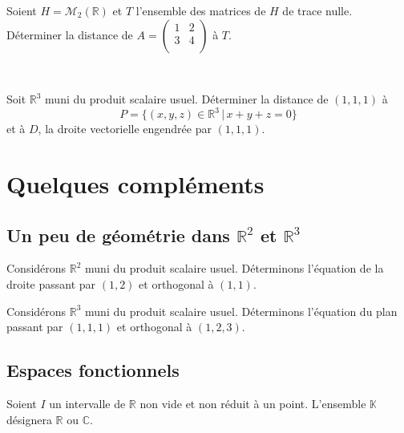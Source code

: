 \documentclass[a4paper,10pt]{report}
\begin{document}
\begin{preuve}
\vspace{8.5cm}
\end{preuve}

\begin{ex} Soient $H = \mathcal{M}_2(\mathbb{R})$ et $T$ l'ensemble des matrices de $H$ de trace nulle. Déterminer la distance de $A = \begin{pmatrix}
1 & 2 \\
3 & 4 \\
\end{pmatrix}$ à $T$.

\end{ex}

\newpage

$\phantom{test}$

\vspace{7cm}


\begin{exa} Soit $\mathbb{R}^3$ muni du produit scalaire usuel. Déterminer la distance de $(1,1,1)$ à 
$$P = \lbrace (x,y,z) \in \mathbb{R}^3 \, \vert \, x+y+z=0 \rbrace$$
 et à $D$, la droite vectorielle engendrée par $(1,1,1)$.
\end{exa}

\section{Quelques compléments}
\subsection{Un peu de géométrie dans $\mathbb{R}^2$ et $\mathbb{R}^3$}
\begin{ex} Considérons $\mathbb{R}^2$ muni du produit scalaire usuel. Déterminons l'équation de la droite passant par $(1,2)$ et orthogonal à $(1,1)$.

\vspace{3cm}
\end{ex}

\begin{ex} Considérons $\mathbb{R}^3$ muni du produit scalaire usuel. Déterminons l'équation du plan passant par $(1,1,1)$ et orthogonal à $(1,2,3)$.

\vspace{3cm}
\end{ex}

\subsection{Espaces fonctionnels}
\noindent Soient $I$ un intervalle de $\mathbb{R}$ non vide et non réduit à un point. L'ensemble $\mathbb{K}$ désignera $\mathbb{R}$ ou $\mathbb{C}$.
\end{document}
